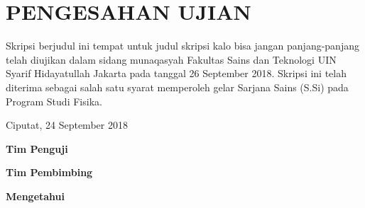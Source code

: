 \chapter*{PENGESAHAN UJIAN}
Skripsi berjudul ini tempat untuk judul skripsi kalo bisa jangan panjang-panjang telah diujikan dalam sidang munaqasyah Fakultas Sains dan Teknologi UIN Syarif Hidayatullah Jakarta pada tanggal 26 September 2018. Skripsi ini telah diterima sebagai salah satu syarat memperoleh gelar Sarjana Sains (S.Si) pada Program Studi Fisika.

\begin{flushright}
    Ciputat, 24 September 2018
\end{flushright}

\centerline{\textbf{Tim Penguji}}

\centerline{\textbf{Tim Pembimbing}}


\centerline{\textbf{Mengetahui}}

